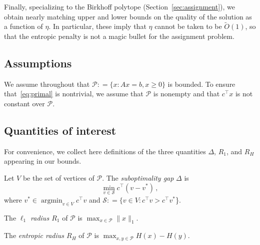 \documentclass[final,12pt]{colt2018}
\newcommand{\cP}{\mathcal{P}}
\newcommand{\cS}{\mathcal{S}}
\newcommand{\1}{\mathds{1}}
\DeclareMathOperator*{\argmin}{argmin}
\newcommand*{\ent}[1]{H(#1)}
\begin{document}
Finally, specializing to the Birkhoff polytope (Section~\ref{sec:assignment}), we obtain nearly matching upper and lower bounds on the quality of the solution as a function of $\eta$.
In particular, these imply that $\eta$ cannot be taken to be $\tilde O(1)$, so that the entropic penalty is not a magic bullet for the assignment problem.

\subsection{Assumptions}\label{sec:assumptions}
We assume throughout that $\cP : = \{x: A x = b, x \geq 0\}$ is bounded.
To ensure that~\eqref{eq:primal} is nontrivial, we assume that $\cP$ is nonempty and that $c^\top x$ is not constant over $\cP$.

\subsection{Quantities of interest}
For convenience, we collect here definitions of the three quantities $\Delta$, $R_1$, and $R_H$ appearing in our bounds.

\begin{definition}
Let $V$ be the set of vertices of $\cP$. The \emph{suboptimality gap} $\Delta$ is
\begin{equation*}
\min_{v \in \cS} c^\top (v - v^*)\,,
\end{equation*}
where $v^* \in \argmin_{v \in V} c^\top v$ and $\cS : = \{v \in V: c^\top v > c^\top v^*$\}.
\end{definition}

\begin{definition}
The \emph{$\ell_1$ radius $R_1$} of $\cP$ is $\max_{x \in \cP} \|x\|_1$.
\end{definition}

\begin{definition}
The \emph{entropic radius $R_H$} of $\cP$ is $\max_{x, y \in \cP} \ent{x} - \ent{y}$.
\end{definition}
\end{document}
